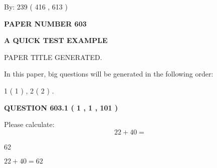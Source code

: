 \documentclass[12pt]{article}
\begin{document}
   
\hspace{1.0in} By: 
 239 ( 416 ,  613 )
   
   
   
   
\newpage 
\setcounter{page}{ 
   603001 } 
   
   
   
   
 {\textbf{ \Large{ PAPER NUMBER  603  }}}
   
   
\vspace{0.2in}
   
   
   
   
   
   
   
   
 \vspace{0.2in}
{\LARGE {\textbf{ A QUICK TEST EXAMPLE}}}
   
   
 PAPER TITLE GENERATED.
   
   
   
\vspace{0.2in}
   
In this paper, big questions will be generated in the following order: 
   
   
   1 ( 1 )
 ,
   2 ( 2 )
 .
  
\vspace{0.2in}
  
{\textbf{\Large{QUESTION
603.1 
 ( 1 , 1 , 101 )
}}}
  
  
 
Please calculate:
\begin{equation}
22 +  %
40 = \nonumber
\end{equation}
 
 
 
\noindent{}
 
 

62
 
 
\noindent{}
 
 

 
 
 
\noindent{}
 
 

$ %
22 +  %
40=   %
62$
 
 
\noindent{}
 
\end{document}
